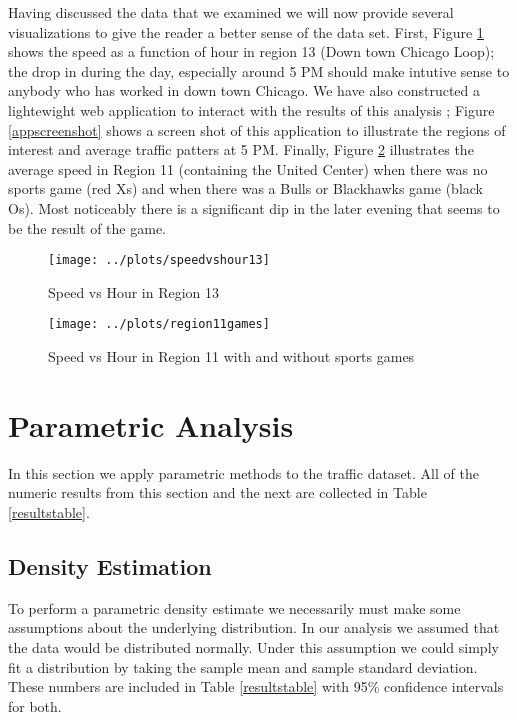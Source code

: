 \documentclass[12pt]{article}
\begin{document}
Having discussed the data that we examined we will now provide several visualizations to give the reader a better sense of the data set. First, Figure \ref{speedvshour13} shows the speed as a function of hour in region 13 (Down town Chicago Loop); the drop in during the day, especially around 5 PM should make intutive sense to anybody who has worked in down town Chicago. We have also constructed a lightewight web application to interact with the results of this analysis \cite{trafficapp}; Figure \ref{appscreenshot} shows a screen shot of this application to illustrate the regions of interest and average traffic patters at 5 PM. Finally, Figure \ref{region11games} illustrates the average speed in Region 11 (containing the United Center) when there was no sports game (red Xs) and when there was a Bulls or Blackhawks game (black Os). Most noticeably there is a significant dip in the later evening that seems to be the result of the game.

\begin{figure}[!ht]
\centering
\texttt{[image: ../plots/speedvshour13]}
\caption{Speed vs Hour in Region 13}
\label{speedvshour13}
\end{figure}

\begin{figure}[!ht]
\centering
\texttt{[image: ../plots/region11games]}
\caption{Speed vs Hour in Region 11 with and without sports games}
\label{region11games}
\end{figure}

\section{Parametric Analysis}
In this section we apply parametric methods to the traffic dataset. All of the numeric results from this section and the next are collected in Table \ref{resultstable}.
\subsection{Density Estimation}
To perform a parametric density estimate we necessarily must make some assumptions about the underlying distribution. In our analysis we assumed that the data would be distributed normally. Under this assumption we could simply fit a distribution by taking the sample mean and sample standard deviation. These numbers are included in Table \ref{resultstable} with 95\% confidence intervals for both.
\end{document}
